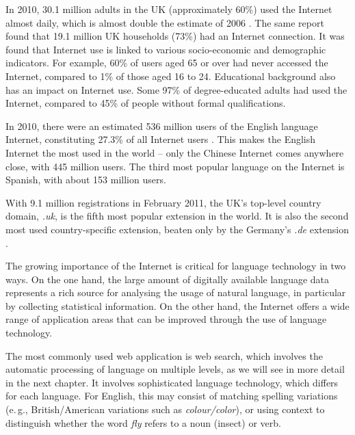 \begin{multicols}{2}
In 2010, 30.1 million adults in the UK (approximately 60\%) used the Internet almost daily, which is almost double the estimate of 2006 \cite{stats1}. The same report found that 19.1 million UK households (73\%) had an Internet connection. It was found that Internet use is linked to various socio-economic and demographic indicators. For example, 60\% of users aged 65 or over had never accessed the Internet, compared to 1\% of those aged 16 to 24. Educational background also has an impact on Internet use. Some 97\% of degree-educated adults had used the Internet, compared to 45\% of people without formal qualifications.

In 2010, there were an estimated 536 million users of the English language Internet, constituting 27.3\% of all Internet users \cite{stats2}. This makes the English Internet the most used in the world -- only the Chinese Internet comes anywhere close, with 445 million users. The third most popular language on the Internet is Spanish, with about 153 million users.

 
With 9.1 million registrations in February 2011, the UK’s top-level country domain, \textit{.uk}, is the fifth most popular extension in the world. It is also the second most used country-specific extension, beaten only by the Germany's \textit{.de} extension \cite{stats3}.
    
The growing importance of the Internet is critical for language technology in two ways. On the one hand, the large amount of digitally available language data represents a rich source for analysing the usage of natural language, in particular by collecting statistical information. On the other hand, the Internet offers a wide range of application areas that can be improved through the use of language technology.


The most commonly used web application is web search, which involves the automatic processing of language on multiple levels, as we will see in more detail in the next chapter. It involves sophisticated language technology, which differs for each language. For English, this may consist of matching spelling variations (e.\,g., British/American variations such as \textit{colour/color}), or using context to distinguish whether the word \textit{fly} refers to a noun (insect) or verb.
  

\end{multicols}
